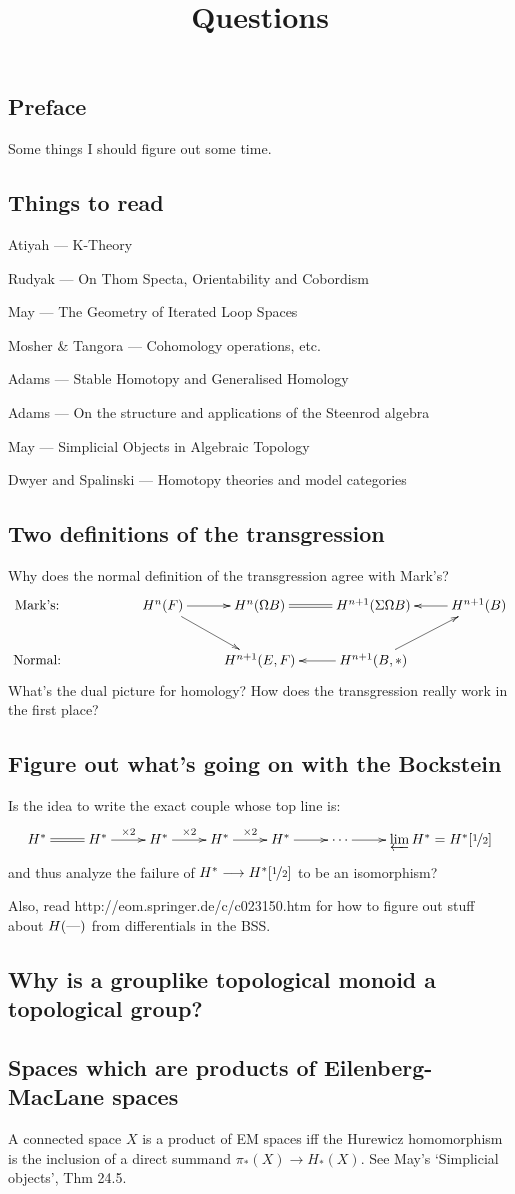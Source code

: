 \documentclass[11pt]{article}
\title{Questions}
\begin{document}
\tableofcontents
\newcommand{\HSsection}[2]{\subsection{#1}}


\HSsection{Preface}{}
Some things I should figure out some time.

\HSsection{Things to read}{}
\newcommand{\BooK}[2]{\item #1 --- #2}
\begin{itemise}
\BooK{Atiyah}{K-Theory}
\BooK{Rudyak}{On Thom Specta, Orientability and Cobordism}
\BooK{May}{The Geometry of Iterated Loop Spaces}
\BooK{Mosher \& Tangora}{Cohomology operations, etc.}
\BooK{Adams}{Stable Homotopy and Generalised Homology}
\BooK{Adams}{On the structure and applications of the Steenrod algebra}
\BooK{May}{Simplicial Objects in Algebraic Topology}
\BooK{Dwyer and Spalinski}{Homotopy theories and model categories}
\end{itemise}

\HSsection{Two definitions of the transgression}{29/6/11}
Why does the normal definition of the transgression agree with Mark's?
\[\xymatrix{
\text{Mark's:}&&\ar[dr]H^n(F)\ar[r]& H^n(\Omega B)\ar@{=}[r]&H^{n+1}(\Sigma\Omega B)&\ar[l] H^{n+1}(B)\\
\text{Normal:}&&&H^{n+1}(E,F)&H^{n+1}(B,*)\ar[ru]\ar[l]
}\]
What's the dual picture for homology?
How does the transgression really work in the first place?
\HSsection{Figure out what's going on with the Bockstein}{30/6/11}
Is the idea to write the exact couple whose top line is:
\[\xymatrix{
H^*\ar@{=}[r]&H^*\ar[r]^{\times2}&H^*\ar[r]^{\times2}&H^*\ar[r]^{\times2}&H^*\ar[r]&\cdots\ar[r]&\varprojlim H^*=H^*[\nicefrac{1}{2}]
}\]
and thus analyze the failure of $H^*\to H^*[\nicefrac{1}{2}]$ to be an isomorphism?

Also, read http://eom.springer.de/c/c023150.htm for how to figure out stuff about $H(\DASH)$ from differentials in the BSS.
\HSsection{Why is a grouplike topological monoid a topological group?}{30/6/11}

\HSsection{Spaces which are products of Eilenberg-MacLane spaces}{6/7/11}
A connected space $X$ is a product of EM spaces iff the Hurewicz homomorphism is the 
inclusion of a direct summand $\pi_*(X)\to H_*(X)$. See May's `Simplicial objects',
Thm 24.5.
\end{document}
